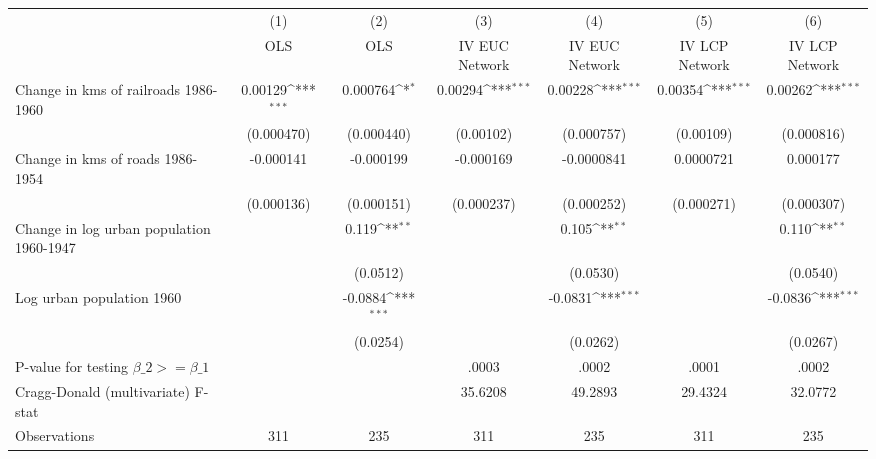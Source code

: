 {
\def\sym#1{\ifmmode^{#1}\else\(^{#1}\)\fi}
\begin{tabular}{l*{6}{c}}
\hline\hline
                &\multicolumn{1}{c}{(1)}&\multicolumn{1}{c}{(2)}&\multicolumn{1}{c}{(3)}&\multicolumn{1}{c}{(4)}&\multicolumn{1}{c}{(5)}&\multicolumn{1}{c}{(6)}\\
                &\multicolumn{1}{c}{OLS}&\multicolumn{1}{c}{OLS}&\multicolumn{1}{c}{IV EUC Network}&\multicolumn{1}{c}{IV EUC Network}&\multicolumn{1}{c}{IV LCP Network}&\multicolumn{1}{c}{IV LCP Network}\\
\hline
Change in kms of railroads 1986-1960&  0.00129\sym{***}& 0.000764\sym{*}  &  0.00294\sym{***}&  0.00228\sym{***}&  0.00354\sym{***}&  0.00262\sym{***}\\
                &(0.000470)         &(0.000440)         &(0.00102)         &(0.000757)         &(0.00109)         &(0.000816)         \\
[1em]
Change in kms of roads 1986-1954&-0.000141         &-0.000199         &-0.000169         &-0.0000841         &0.0000721         & 0.000177         \\
                &(0.000136)         &(0.000151)         &(0.000237)         &(0.000252)         &(0.000271)         &(0.000307)         \\
[1em]
Change in log urban population 1960-1947&                  &    0.119\sym{**} &                  &    0.105\sym{**} &                  &    0.110\sym{**} \\
                &                  & (0.0512)         &                  & (0.0530)         &                  & (0.0540)         \\
[1em]
Log urban population 1960&                  &  -0.0884\sym{***}&                  &  -0.0831\sym{***}&                  &  -0.0836\sym{***}\\
                &                  & (0.0254)         &                  & (0.0262)         &                  & (0.0267)         \\
\hline
P-value for testing $\beta\_{2} >= \beta\_{1}$&                  &                  &    .0003         &    .0002         &    .0001         &    .0002         \\
Cragg-Donald (multivariate) F-stat&                  &                  &  35.6208         &  49.2893         &  29.4324         &  32.0772         \\
Observations    &      311         &      235         &      311         &      235         &      311         &      235         \\
\hline\hline
\end{tabular}
}
